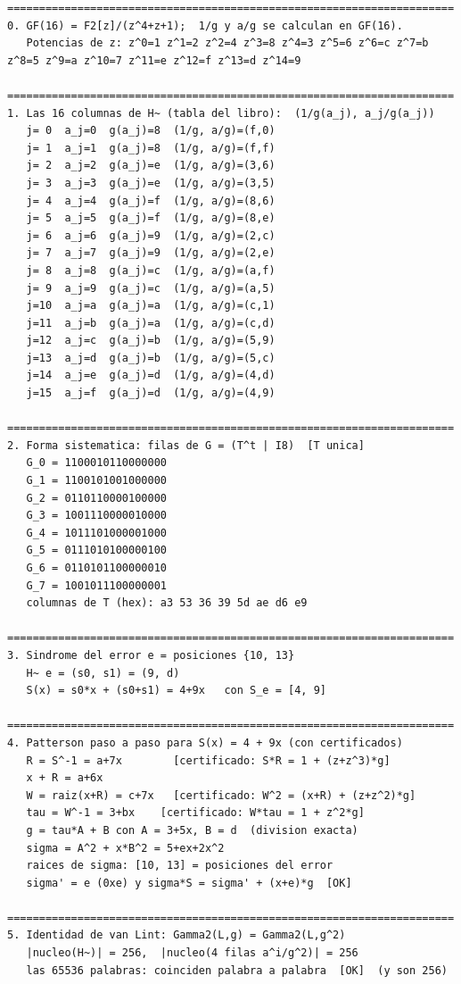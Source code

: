 \documentclass[11pt,a4paper,oneside]{report}
\begin{document}
\begin{lstlisting}[numbers=none]
======================================================================
0. GF(16) = F2[z]/(z^4+z+1);  1/g y a/g se calculan en GF(16).
   Potencias de z: z^0=1 z^1=2 z^2=4 z^3=8 z^4=3 z^5=6 z^6=c z^7=b z^8=5 z^9=a z^10=7 z^11=e z^12=f z^13=d z^14=9

======================================================================
1. Las 16 columnas de H~ (tabla del libro):  (1/g(a_j), a_j/g(a_j))
   j= 0  a_j=0  g(a_j)=8  (1/g, a/g)=(f,0)
   j= 1  a_j=1  g(a_j)=8  (1/g, a/g)=(f,f)
   j= 2  a_j=2  g(a_j)=e  (1/g, a/g)=(3,6)
   j= 3  a_j=3  g(a_j)=e  (1/g, a/g)=(3,5)
   j= 4  a_j=4  g(a_j)=f  (1/g, a/g)=(8,6)
   j= 5  a_j=5  g(a_j)=f  (1/g, a/g)=(8,e)
   j= 6  a_j=6  g(a_j)=9  (1/g, a/g)=(2,c)
   j= 7  a_j=7  g(a_j)=9  (1/g, a/g)=(2,e)
   j= 8  a_j=8  g(a_j)=c  (1/g, a/g)=(a,f)
   j= 9  a_j=9  g(a_j)=c  (1/g, a/g)=(a,5)
   j=10  a_j=a  g(a_j)=a  (1/g, a/g)=(c,1)
   j=11  a_j=b  g(a_j)=a  (1/g, a/g)=(c,d)
   j=12  a_j=c  g(a_j)=b  (1/g, a/g)=(5,9)
   j=13  a_j=d  g(a_j)=b  (1/g, a/g)=(5,c)
   j=14  a_j=e  g(a_j)=d  (1/g, a/g)=(4,d)
   j=15  a_j=f  g(a_j)=d  (1/g, a/g)=(4,9)

======================================================================
2. Forma sistematica: filas de G = (T^t | I8)  [T unica]
   G_0 = 1100010110000000
   G_1 = 1100101001000000
   G_2 = 0110110000100000
   G_3 = 1001110000010000
   G_4 = 1011101000001000
   G_5 = 0111010100000100
   G_6 = 0110101100000010
   G_7 = 1001011100000001
   columnas de T (hex): a3 53 36 39 5d ae d6 e9

======================================================================
3. Sindrome del error e = posiciones {10, 13}
   H~ e = (s0, s1) = (9, d)
   S(x) = s0*x + (s0+s1) = 4+9x   con S_e = [4, 9]

======================================================================
4. Patterson paso a paso para S(x) = 4 + 9x (con certificados)
   R = S^-1 = a+7x        [certificado: S*R = 1 + (z+z^3)*g]
   x + R = a+6x
   W = raiz(x+R) = c+7x   [certificado: W^2 = (x+R) + (z+z^2)*g]
   tau = W^-1 = 3+bx    [certificado: W*tau = 1 + z^2*g]
   g = tau*A + B con A = 3+5x, B = d  (division exacta)
   sigma = A^2 + x*B^2 = 5+ex+2x^2
   raices de sigma: [10, 13] = posiciones del error
   sigma' = e (0xe) y sigma*S = sigma' + (x+e)*g  [OK]

======================================================================
5. Identidad de van Lint: Gamma2(L,g) = Gamma2(L,g^2)
   |nucleo(H~)| = 256,  |nucleo(4 filas a^i/g^2)| = 256
   las 65536 palabras: coinciden palabra a palabra  [OK]  (y son 256)


\end{lstlisting}
\end{document}
